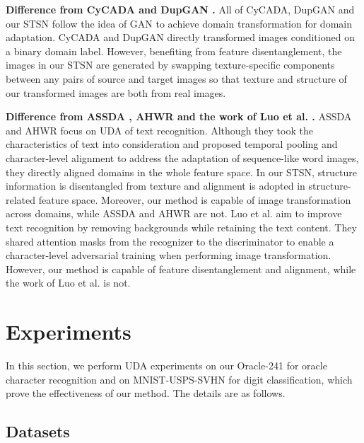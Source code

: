\documentclass[10pt,journal,compsoc,twocolumn ]{IEEEtran}
\begin{document}
\textbf{Difference from CyCADA \cite{hoffman2018cycada} and DupGAN \cite{hu2018duplex}.} All of CyCADA, DupGAN and our STSN follow the idea of GAN to achieve domain transformation for domain adaptation. CyCADA and DupGAN directly transformed images conditioned on a binary domain label. %
However, benefiting from feature disentanglement, the images in our STSN are generated by swapping texture-specific components between any pairs of source and target images so that texture and structure of our transformed images are both from real images.

\textbf{Difference from ASSDA \cite{zhang2021robust}, AHWR \cite{kang2020unsupervised} and the work of Luo et al. \cite{luo2021separating}.} ASSDA and AHWR focus on UDA of text recognition. Although they took the characteristics of text into consideration and proposed temporal pooling and character-level alignment to address the adaptation of sequence-like word images, they directly aligned domains in the whole feature space. In our STSN, structure information is disentangled from texture and alignment is adopted in structure-related feature space. Moreover, our method is capable of image transformation across domains, while ASSDA and AHWR are not. Luo et al. \cite{luo2021separating} aim to improve text recognition by removing backgrounds while retaining the text content. They shared attention masks from the recognizer to the discriminator to enable a character-level adversarial training when performing image transformation. However, our method is capable of feature disentanglement and alignment, while the work of Luo et al. is not.

\section{Experiments}

In this section, we perform UDA experiments on our Oracle-241 for oracle character recognition and on MNIST-USPS-SVHN \cite{lecun1998gradient,netzer2011reading,denker1989neural} for digit classification, which prove the effectiveness of our method. The details are as follows.

\subsection{Datasets}
\end{document}
